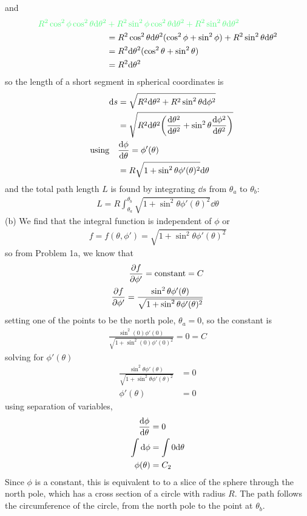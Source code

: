 \documentclass[../hw.tex]{subfiles}
\begin{document}
and 
\begin{align*}
    \color{draculagreen} R^2 \cos^2\phi \cos^2\theta \dd\theta^2
        & \color{draculagreen} + R^2 \sin^2\phi \cos^2\theta \dd\theta^2
        + R^2 \sin^2\theta \dd\theta^2 \\
        &= R^2 \cos^2\theta \dd\theta^2 (\cos^2\phi + \sin^2\phi) + R^2 \sin^2\theta \dd\theta^2 \\
        &= R^2 \dd\theta^2 (\cos^2\theta + \sin^2\theta)\\
        &= R^2 \dd\theta^2
\end{align*}
so the length of a short segment in spherical coordinates is
\begin{align*}
    \dd s &= \sqrt{R^2 \dd\theta^2 + R^2 \sin^2 \theta \dd\phi^2 } \\
        &= \sqrt{R^2 \dd\theta^2 \qt(\frac{\dd\theta^2}{\dd\theta^2}
            + \sin^2\theta \frac{\dd\phi^2}{\dd\theta^2})} \\
    \qusing &\dv{\phi}{\theta} = \phi'(\theta) \\
    &= R \sqrt{1 + \sin^2\theta \phi'(\theta)^2} \dd \theta 
\end{align*}
and the total path length $L$ is found by integrating $\dd s$ from $\theta_a$ to $\theta_b$: 
\begin{align*}
    L = R \int_{\theta_a}^{\theta_b} \sqrt{1 + \sin^2\theta \phi'(\theta)^2} \dd \theta
\end{align*}
(b) We find that the integral function is independent of $\phi$ or
\begin{align*}
    f = f(\theta, \phi') = \sqrt{1 + \sin^2\theta \phi'(\theta)^2}
\end{align*} so from 
Problem 1a, we know that
\begin{align*}
    \pdv{f}{\phi'} = \mathrm{constant} = C \\
    \pdv{f}{\phi'} = \frac{\sin^2\theta \phi'(\theta)}{\sqrt{1 + \sin^2\theta \phi'(\theta)^2}}
\end{align*}
setting one of the points to be the north pole, $\theta_a = 0$, so the constant is
\begin{align*}
    \frac{\sin^2(0) \phi'(0)}{\sqrt{1 + \sin^2(0) \phi'(0)^2}} = 0 = C
\end{align*}
solving for $\phi'(\theta)$
\begin{align*}
    \frac{\sin^2\theta \phi'(\theta)}{\sqrt{1 + \sin^2\theta \phi'(\theta)^2}} &= 0 \\
    \phi'(\theta) &= 0
\end{align*}
using separation of variables,
\begin{align*}
    \dv{\phi}{\theta} &= 0 \\
    \int \dd \phi &= \int 0 \dd \theta \\
    \phi(\theta) &= C_2
\end{align*}
Since $\phi$ is a constant, this is equivalent to to a slice of the sphere through the north pole,
which has a cross section of a circle with radius $R$. The path follows the circumference of the
circle, from the north pole to the point at $\theta_b$.
\end{document}
